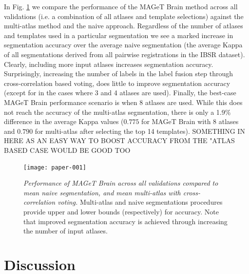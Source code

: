 \documentclass{article}
\begin{document}
In Fig. \ref{results} we compare the performance of the MAGeT Brain method
across all validations (i.e. a combination of all atlases and template
selections) against the multi-atlas method and the naive approach.
Regardless of the number of atlases and templates used in a particular
segmentation we see a marked increase in segmentation accuracy over the
average naive segmentation (the average Kappa of all segmentations derived
from all pairwise registrations in the IBSR dataset).  Clearly, including
more input atlases increases segmentation accuracy.  Surprisingly,
increasing the number of labels in the label fusion step through
cross-correlation based voting, does little to improve segmentation
accuracy (except for in the cases where 3 and 4 atlases are used).
Finally, the best-case MAGeT Brain performance scenario is when 8 atlases
are used.  While this does not reach the accuracy of the multi-atlas
segmentation, there is only a 1.9\% difference in the average Kappa values
($0.775$ for MAGeT Brain with 8 atlases and $0.790$ for multi-atlas after
selecting the top 14 templates).  {SOMETHING IN HERE AS AN EASY WAY TO BOOST ACCURACY FROM THE "ATLAS BASED CASE WOULD BE GOOD TOO}



\begin{figure}
\begin{minipage}[b]{1.0\linewidth}
  \centering
\texttt{[image: paper-001]}
\end{minipage}
\caption{{\em Performance of MAGeT Brain across all validations compared to
mean naive segmentation, and mean multi-atlas with cross-correlation voting.}
Multi-atlas and naive segmentations procedures provide upper and lower bounds
(respectively) for accuracy.  Note that improved segmentation accuracy is
achieved through increasing the number of input atlases.}
\label{results}
\end{figure}

\section{Discussion}
\end{document}
